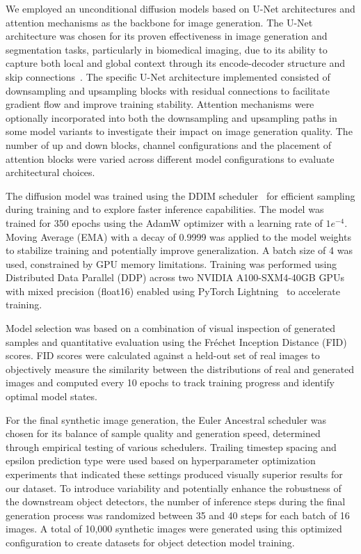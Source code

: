 We employed an unconditional diffusion models based on U-Net architectures and attention mechanisms as the backbone for image generation.
The U-Net architecture was chosen for its proven effectiveness in image generation and segmentation tasks, particularly in biomedical imaging, due to its ability to capture both local and global context through its encode-decoder structure and skip connections~\cite{ronneberger_u-net_2015}.
The specific U-Net architecture implemented consisted of downsampling and upsampling blocks with residual connections to facilitate gradient flow and improve training stability.
Attention mechanisms were optionally incorporated into both the downsampling and upsampling paths in some model variants to investigate their impact on image generation quality.
The number of up and down blocks, channel configurations and the placement of attention blocks were varied across different model configurations to evaluate architectural choices.

The diffusion model was trained using the DDIM scheduler~\cite{song_denoising_2020} for efficient sampling during training and to explore faster inference capabilities.
The model was trained for 350 epochs using the AdamW optimizer with a learning rate of $1e^{-4}$.
Moving Average (EMA) with a decay of 0.9999 was applied to the model weights to stabilize training and potentially improve generalization.
A batch size of 4 was used, constrained by GPU memory limitations.
Training was performed using Distributed Data Parallel (DDP) across two NVIDIA A100-SXM4-40GB GPUs with mixed precision (float16) enabled using PyTorch Lightning~\cite{falcon_pytorchlightningpytorch-lightning_2020} to accelerate training.

Model selection was based on a combination of visual inspection of generated samples and quantitative evaluation using the Fréchet Inception Distance (FID) scores.
FID scores were calculated against a held-out set of real images to objectively measure the similarity between the distributions of real and generated images and computed every 10 epochs to track training progress and identify optimal model states.

For the final synthetic image generation, the Euler Ancestral scheduler was chosen for its balance of sample quality and generation speed, determined through empirical testing of various schedulers.
Trailing timestep spacing and epsilon prediction type were used based on hyperparameter optimization experiments that indicated these settings produced visually superior results for our dataset.
To introduce variability and potentially enhance the robustness of the downstream object detectors, the number of inference steps during the final generation process was randomized between 35 and 40 steps for each batch of 16 images.
A total of 10,000 synthetic images were generated using this optimized configuration to create datasets for object detection model training.

